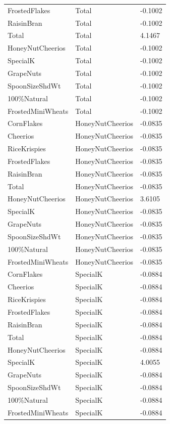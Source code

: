 \begin{table}[!htbp]
\begin{tabular}{lll}
\\
FrostedFlakes & Total & -0.1002
\\
RaisinBran & Total & -0.1002
\\
Total & Total & 4.1467
\\
HoneyNutCheerios & Total & -0.1002
\\
SpecialK & Total & -0.1002
\\
GrapeNuts & Total & -0.1002
\\
SpoonSizeShdWt & Total & -0.1002
\\
100\%Natural & Total & -0.1002
\\
FrostedMiniWheats & Total & -0.1002
\\
CornFlakes & HoneyNutCheerios & -0.0835
\\
Cheerios & HoneyNutCheerios & -0.0835
\\
RiceKrispies & HoneyNutCheerios & -0.0835
\\
FrostedFlakes & HoneyNutCheerios & -0.0835
\\
RaisinBran & HoneyNutCheerios & -0.0835
\\
Total & HoneyNutCheerios & -0.0835
\\
HoneyNutCheerios & HoneyNutCheerios & 3.6105
\\
SpecialK & HoneyNutCheerios & -0.0835
\\
GrapeNuts & HoneyNutCheerios & -0.0835
\\
SpoonSizeShdWt & HoneyNutCheerios & -0.0835
\\
100\%Natural & HoneyNutCheerios & -0.0835
\\
FrostedMiniWheats & HoneyNutCheerios & -0.0835
\\
CornFlakes & SpecialK & -0.0884
\\
Cheerios & SpecialK & -0.0884
\\
RiceKrispies & SpecialK & -0.0884
\\
FrostedFlakes & SpecialK & -0.0884
\\
RaisinBran & SpecialK & -0.0884
\\
Total & SpecialK & -0.0884
\\
HoneyNutCheerios & SpecialK & -0.0884
\\
SpecialK & SpecialK & 4.0055
\\
GrapeNuts & SpecialK & -0.0884
\\
SpoonSizeShdWt & SpecialK & -0.0884
\\
100\%Natural & SpecialK & -0.0884
\\
FrostedMiniWheats & SpecialK & -0.0884
\\

\end{tabular}
\end{table}

